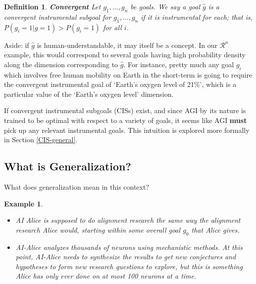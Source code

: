 \documentclass{article}
\newtheorem{definition}{Definition}
\newtheorem{example}{Example}
\begin{document}
\begin{definition}{\textbf{Convergent}}
    Let $g_1, \dots, g_n$ be goals. We say a goal $\hat{g}$ is a convergent instrumental subgoal for $g_1, \dots, g_n$ if it is instrumental for each; that is, $P(g_i=1|\hat{g}=1)>P(g_i=1)$ for all $i$.
\end{definition}

Aside: if $\hat{g}$ is human-understandable, it may itself be a concept. In our $\mathcal{R}^n$ example, this would correspond to several goals having high probability density along the dimension corresponding to $\hat{g}$. For instance, pretty much any goal $g_i$ which involves free human mobility on Earth in the short-term is going to require the convergent instrumental goal of `Earth's oxygen level of $21\%$', which is a particular value of the `Earth's oxygen level' dimension.


If convergent instrumental subgoals (CISs) exist, and since AGI by its nature is trained to be optimal with respect to a variety of goals, it seems like AGI \textbf{must} pick up any relevant instrumental goals. This intuition is explored more formally in Section \ref{CIS-general}.

\subsection{What is Generalization?}
What does generalization mean in this context?

\begin{example}
\begin{itemize}
    \item AI Alice is supposed to do alignment research the same way the alignment research Alice would, starting within some overall goal $g_0$ that Alice gives.
    \item AI-Alice analyzes thousands of neurons using mechanistic methods. At this point, AI-Alice needs to synthesize the results to get new conjectures and hypotheses to form new research questions to explore, but this is something Alice has only ever done on at most 100 neurons at a time.
\end{itemize}
\end{example}
\end{document}
